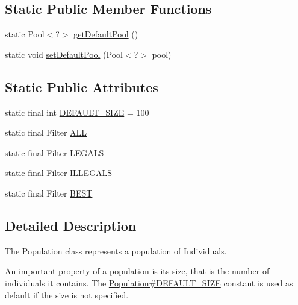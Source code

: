 \subsection*{Static Public Member Functions}
\begin{DoxyCompactItemize}
\item 
static Pool$<$?$>$ \hyperlink{classjenes_1_1population_1_1_population_3_01_t_01extends_01_chromosome_01_4_adf33dd4053815e1ec5e1f7026e2fef19}{get\-Default\-Pool} ()
\item 
static void \hyperlink{classjenes_1_1population_1_1_population_3_01_t_01extends_01_chromosome_01_4_a23696a2d226ab74e263d141b91864efd}{set\-Default\-Pool} (Pool$<$?$>$ pool)
\end{DoxyCompactItemize}
\subsection*{Static Public Attributes}
\begin{DoxyCompactItemize}
\item 
static final int \hyperlink{classjenes_1_1population_1_1_population_3_01_t_01extends_01_chromosome_01_4_aada0b23838115e85378efcd67c1904e3}{D\-E\-F\-A\-U\-L\-T\-\_\-\-S\-I\-Z\-E} = 100
\item 
static final Filter \hyperlink{classjenes_1_1population_1_1_population_3_01_t_01extends_01_chromosome_01_4_a5cfea1b7e0a14171b85d3ae7460f0723}{A\-L\-L}
\item 
static final Filter \hyperlink{classjenes_1_1population_1_1_population_3_01_t_01extends_01_chromosome_01_4_a99a629869951da716c9efc8be2fdbb70}{L\-E\-G\-A\-L\-S}
\item 
static final Filter \hyperlink{classjenes_1_1population_1_1_population_3_01_t_01extends_01_chromosome_01_4_acbb46d951b86374304f72246d3142bce}{I\-L\-L\-E\-G\-A\-L\-S}
\item 
static final Filter \hyperlink{classjenes_1_1population_1_1_population_3_01_t_01extends_01_chromosome_01_4_abf7824fc3827456cc071a313586adf20}{B\-E\-S\-T}
\end{DoxyCompactItemize}


\subsection{Detailed Description}
The Population class represents a population of {\ttfamily Individual}s. 

An important property of a population is its size, that is the number of individuals it contains. The \hyperlink{}{Population\#\-D\-E\-F\-A\-U\-L\-T\-\_\-\-S\-I\-Z\-E} constant is used as default if the size is not specified. 

